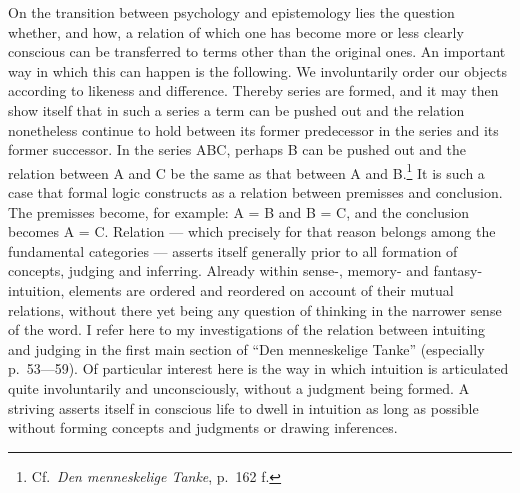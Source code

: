 \documentclass[12pt]{article}
\newcommand{\opage}[1]{\marginnote{\footnotesize\textit{[#1]}}}
\begin{document}
On the transition between psychology and epistemology lies the question
whether, and how, a relation of which one has become more or less clearly
conscious can be transferred to terms other than the original ones. An
important way \opage{23}in which this can happen is the following. We involuntarily
order our objects according to likeness and difference. Thereby series are
formed, and it may then show itself that in such a series a term can be
pushed out and the relation nonetheless continue to hold between its former
predecessor in the series and its former successor. In the series ABC,
perhaps B can be pushed out and the relation between A and C be the same as
that between A and B.\footnote{Cf.\ \textit{Den menneskelige Tanke},
  p.~162 f.} It is such a case that formal logic constructs as a relation
between premisses and conclusion. The premisses become, for example: A = B
and B = C, and the conclusion becomes A = C. Relation --- which precisely
for that reason belongs among the fundamental categories --- asserts itself
generally prior to all formation of concepts, judging and inferring. Already
within sense-, memory- and fantasy-intuition, elements are ordered and
reordered on account of their mutual relations, without there yet being any
question of thinking in the narrower sense of the word. I refer here to my
investigations of the relation between intuiting and judging in the first
main section of ``Den menneskelige Tanke'' (especially p.~53---59). Of
particular interest here is the way in which intuition is articulated quite
involuntarily and unconsciously, without a judgment being formed. A striving
asserts itself in conscious life to dwell in intuition as long as possible
without forming concepts and judgments or drawing inferences.
\end{document}
